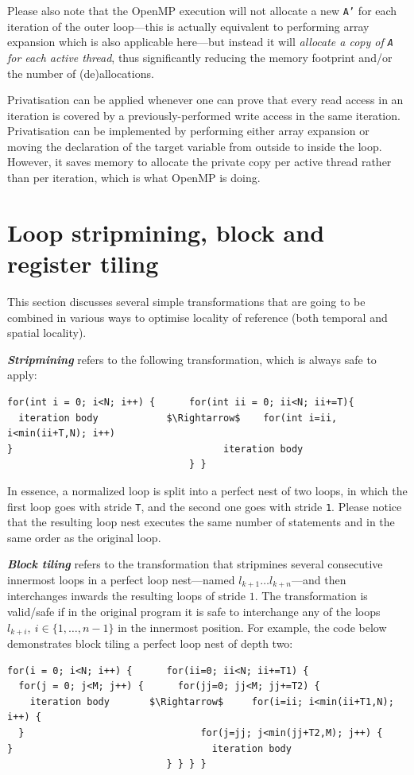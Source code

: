 Please also note that the OpenMP execution will not allocate
a new \texttt{A'} for each iteration of the outer loop---this is
actually equivalent to performing array expansion which is also
applicable here---but instead it will {\em allocate a copy of
  \texttt{A} for each active thread}, thus significantly reducing
the memory footprint and/or the number of (de)allocations.

Privatisation can be applied whenever one can prove that every read
access in an iteration is covered by a previously-performed write
access in the same iteration.  Privatisation can be implemented by
performing either array expansion or moving the declaration of the
target variable from outside to inside the loop. However, it saves
memory to allocate the private copy per active thread rather than per
iteration, which is what OpenMP is doing.

\section{Loop stripmining, block and register tiling}
\label{sec:strip-tiling}

This section discusses several simple transformations that are going
to be combined in various ways to optimise locality of reference (both
temporal and spatial locality).

\textbf{\em Stripmining} refers to the following transformation,
which is always safe to apply:
\begin{lstlisting}[mathescape=true]
for(int i = 0; i<N; i++) {      for(int ii = 0; ii<N; ii+=T){
  iteration body            $\Rightarrow$    for(int i=ii, i<min(ii+T,N); i++)
}                                     iteration body
                                } }
\end{lstlisting}
In essence, a normalized loop is split into a perfect nest of two
loops, in which the first loop goes with stride \texttt{T}, and
the second one goes with stride \texttt{1}. Please notice that the
resulting loop nest executes the same number of statements and
in the same order as the original loop.

\textbf{\em Block tiling} refers to the transformation that
stripmines several consecutive innermost loops in a
perfect loop nest---named $l_{k+1}\ldots l_{k+n}$---and then
interchanges inwards the resulting loops of stride $1$.
The transformation is valid/safe if in the original program
it is safe to interchange any of the loops
$l_{k+i},~i\in\{1,\ldots,n-1\}$ in the innermost position.
For example, the code below demonstrates block tiling a perfect
loop nest of depth two:
\begin{lstlisting}[mathescape=true]
for(i = 0; i<N; i++) {      for(ii=0; ii<N; ii+=T1) {
  for(j = 0; j<M; j++) {      for(jj=0; jj<M; jj+=T2) {
    iteration body       $\Rightarrow$     for(i=ii; i<min(ii+T1,N); i++) {
  }                               for(j=jj; j<min(jj+T2,M); j++) {
}                                   iteration body
                            } } } }
\end{lstlisting}


